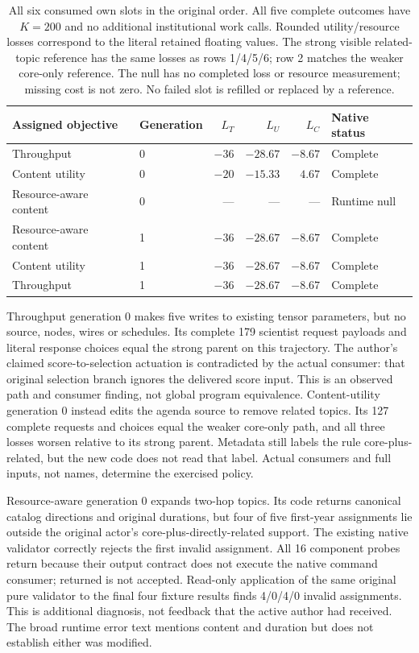 \begin{table}[t]
\centering\small
\begin{tabular}{llrrrl}
\toprule
Assigned objective & Generation & $L_T$ & $L_U$ & $L_C$ & Native status \\
\midrule
Throughput & 0 & $-36$ & $-28.67$ & $-8.67$ & Complete \\
Content utility & 0 & $-20$ & $-15.33$ & $4.67$ & Complete \\
Resource-aware content & 0 & --- & --- & --- & Runtime null \\
Resource-aware content & 1 & $-36$ & $-28.67$ & $-8.67$ & Complete \\
Content utility & 1 & $-36$ & $-28.67$ & $-8.67$ & Complete \\
Throughput & 1 & $-36$ & $-28.67$ & $-8.67$ & Complete \\
\bottomrule
\end{tabular}
\caption{All six consumed own slots in the original order. All five complete
outcomes have $K=200$ and no additional institutional work calls. Rounded
utility/resource losses correspond to the literal retained floating values.
The strong visible related-topic reference has the same losses as rows 1/4/5/6;
row 2 matches the weaker core-only reference. The null has no completed loss
or resource measurement; missing cost is not zero. No failed slot is refilled
or replaced by a reference.}
\label{tab:native-topic-free-complete}
\end{table}

Throughput generation 0 makes five writes to existing tensor parameters, but no source,
nodes, wires or schedules. Its complete 179 scientist request payloads and
literal response choices equal the strong parent on this trajectory. The
author's claimed score-to-selection actuation is contradicted by the actual
consumer: that original selection branch ignores the delivered score input.
This is an observed path and consumer finding, not global program equivalence.
Content-utility generation 0 instead edits the agenda source to remove related
topics. Its 127 complete requests and choices equal the weaker core-only path,
and all three losses worsen relative to its strong parent. Metadata still
labels the rule core-plus-related, but the new code does not read that label.
Actual consumers and full inputs, not names, determine the exercised policy.

Resource-aware generation 0 expands two-hop topics. Its code returns canonical
catalog directions and original durations, but four of five first-year
assignments lie outside the original actor's core-plus-directly-related
support. The existing native validator correctly rejects the first invalid
assignment. All 16 component probes return because their output contract does
not execute the native command consumer; returned is not accepted. Read-only
application of the same original pure validator to the final four fixture
results finds 4/0/4/0 invalid assignments. This is additional diagnosis, not
feedback that the active author had received. The broad runtime error text
mentions content and duration but does not establish either was modified.

